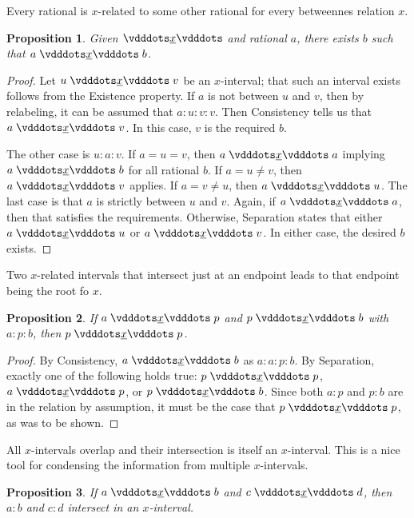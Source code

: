 \documentclass[12pt]{article}
\newtheorem{proposition}{Proposition}[section]
\begin{document}
Every rational is $x$-related to some other rational for every betweennes relation $x$. 

\begin{proposition}\label{br:existence}
    Given $\xrel$ and rational $a$, there exists $b$ such that $a \xrel b$. 
\end{proposition}

\begin{proof}
    Let $u \xrel v$ be an $x$-interval; that such an interval exists follows from the Existence property. If $a$ is not between $u$ and $v$, then by relabeling, it can be assumed that $a:u:v:v$. Then Consistency tells us that $a \xrel v$. In this case, $v$ is the required $b$. 

    The other case is $u:a:v$. If $a = u = v$, then $a \xrel a$ implying $a \xrel b$ for all rational $b$.  If $a = u \neq v$, then $a \xrel v$ applies. If $a  = v \neq u$, then $a \xrel u$. The last case is that $a$ is strictly between $u$ and $v$. Again, if $a \xrel a$, then that satisfies the requirements. Otherwise, Separation states that either $a \xrel u$ or $a \xrel v$. In either case, the desired $b$ exists. 
\end{proof}

Two $x$-related intervals that intersect just at an endpoint leads to that endpoint being the root fo $x$. 

\begin{proposition}\label{br:endpointed}
    If $a \xrel p$ and $p \xrel b$ with $a:p:b$, then $p \xrel p$.
\end{proposition}

\begin{proof}
    By Consistency, $a \xrel b$ as $a:a:p:b$.  By Separation, exactly one of the following holds true: $p \xrel p$,  \sout{$a \xrel p$}, or \sout{$p \xrel b$}. Since both $a:p$ and $p:b$ are in the relation by assumption, it must be the case that $p \xrel p$, as was to be shown. 
\end{proof}

All $x$-intervals overlap and their intersection is itself an $x$-interval. This is a nice tool for condensing the information from multiple $x$-intervals. 

\begin{proposition}\label{br:intersect}
    If $a \xrel b$ and $c \xrel d$, then $a:b$ and $c:d$ intersect in an $x$-interval. 
\end{proposition}
\end{document}
